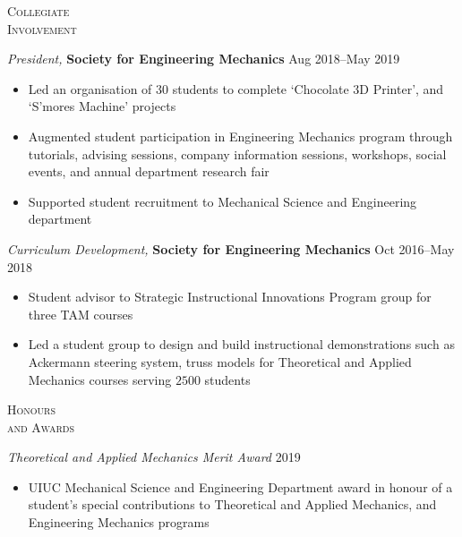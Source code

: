 \documentclass[10pt]{article}
\begin{document}
\begin{multicols}{2}
\textsc{\small Collegiate \\ Involvement}
\columnbreak

{\sl President,} \textbf{Society for Engineering Mechanics} \hfill Aug 2018--May 2019

\vspace{-1.75em}
\begin{itemize}[label=-]
    \setlength\itemsep{-0.25em}
    \item Led an organisation of $30$ students to complete `Chocolate 3D Printer', and `S'mores Machine' projects
    \item Augmented student participation in Engineering Mechanics program through tutorials, advising sessions, company information sessions, workshops, social events, and annual department research fair
    \item Supported student recruitment to Mechanical Science and Engineering department
\end{itemize}
\vspace{-2.0em}

\vspace{0.5em}
%
{\sl Curriculum Development,} \textbf{Society for Engineering Mechanics} \hfill Oct 2016--May 2018

\vspace{-1.75em}
\begin{itemize}[label=-]
    \setlength\itemsep{-0.25em}
    \item Student advisor to Strategic Instructional Innovations Program group for three TAM courses
    \item Led a student group to design and build instructional demonstrations such as  Ackermann steering system, truss models for Theoretical and Applied Mechanics courses serving $2500$ students
\end{itemize}
\vspace{-2.0em}

\end{multicols}
\vspace{-1.5em} 
\begin{multicols}{2}
\textsc{\small Honours \\ and Awards}
\columnbreak

{\sl Theoretical and Applied Mechanics Merit Award} \hfill 2019

\vspace{-1.75em}
\begin{itemize}[label= ]
    \setlength\itemsep{-0.25em}
    \item  UIUC Mechanical Science and Engineering Department award in honour of a student's special contributions to Theoretical and Applied Mechanics, and Engineering Mechanics programs
\end{itemize}
\vspace{-2.0em}

\end{multicols}
\end{document}
